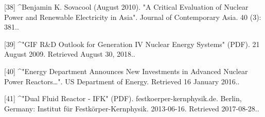 [38]
^Benjamin K. Sovacool (August 2010). "A Critical Evaluation of Nuclear Power and Renewable Electricity in Asia". Journal of Contemporary Asia. 40 (3): 381..

[39]
^"GIF R&D Outlook for Generation IV Nuclear Energy Systems" (PDF). 21 August 2009. Retrieved August 30, 2018..

[40]
^"Energy Department Announces New Investments in Advanced Nuclear Power Reactors…". US Department of Energy. Retrieved 16 January 2016..

[41]
^"Dual Fluid Reactor - IFK" (PDF). festkoerper-kernphysik.de. Berlin, Germany: Institut für Festkörper-Kernphysik. 2013-06-16. Retrieved 2017-08-28..